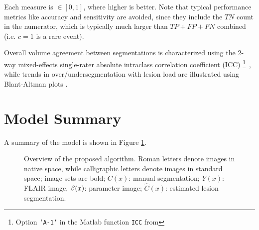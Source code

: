 Each measure is $\in [0,1]$, where higher is better. Note that typical performance metrics like accuracy and sensitivity are avoided, since they include the $TN$ count in the numerator, which is typically much larger than $TP + FP + FN$ combined (i.e. $c=1$ is a rare event).
\par
Overall volume agreement between segmentations is characterized using the 2-way mixed-effects single-rater absolute intraclass correlation coefficient (ICC)%
\footnote{Option \texttt{`A-1'} in the Matlab function \texttt{ICC} from }\ 
\cite{Koo2016}, while trends in over/undersegmentation with lesion load are illustrated using Blant-Altman plots \cite{Altman1983}.
\section{Model Summary}



A summary of the model is shown in Figure \ref{fig:modelsum}.
\begin{figure}
  \centering\scalebox{0.65}{}
  \caption{Overview of the proposed algorithm. Roman letters denote images in native space, while calligraphic letters denote images in standard space; image sets are bold; $C(x)$: manual segmentation; $Y(x)$: FLAIR image, $\beta(x)$: parameter image; $\hat{C}(x)$: estimated lesion segmentation.}
  \label{fig:modelsum}
\end{figure}
